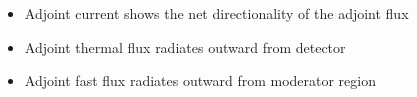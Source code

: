 \documentclass[t]{beamer}
\begin{document}
\begin{frame}
\begin{columns}
\begin{figure}
    \end{figure}
  \end{columns}
  \begin{itemize}
    \item Adjoint current shows the net directionality of the adjoint flux
    \item Adjoint thermal flux radiates outward from detector
    \item Adjoint fast flux radiates outward from moderator region
  \end{itemize}
\end{frame}

\end{document}
